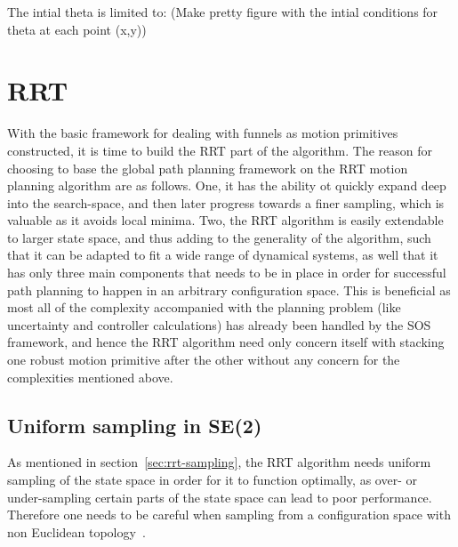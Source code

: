 The intial theta is limited to: (Make pretty figure with the intial conditions
for theta at each point (x,y))

\section{RRT}

With the basic framework for dealing with funnels as motion primitives
constructed, it is time to build the \ac{RRT} part of the \rrtfunnel{}
algorithm. The reason for choosing to base the global path planning framework on
the \ac{RRT} motion planning algorithm are as follows. One, it has the ability
ot quickly expand deep into the search-space, and then later progress towards a
finer sampling, which is valuable as it avoids local minima. Two, the \ac{RRT}
algorithm is easily extendable to larger state space, and thus adding to the
generality of the \rrtfunnel{} algorithm, such that it can be adapted to fit a
wide range of dynamical systems, as well that it has only three main components
that needs to be in place in order for successful path planning to happen in an
arbitrary configuration space. This is beneficial as most all of the complexity
accompanied with the planning problem (like uncertainty and controller
calculations) has already been handled by the \ac{SOS} framework, and hence the
\ac{RRT} algorithm need only concern itself with stacking one robust motion
primitive after the other without any concern for the complexities mentioned
above.

\subsection{Uniform sampling in SE(2)}

As mentioned in section~\ref{sec:rrt-sampling}, the \ac{RRT} algorithm needs
uniform sampling of the state space in order for it to function optimally, as
over- or under-sampling certain parts of the state space can lead to poor
performance. Therefore one needs to be careful when sampling from a
configuration space with non Euclidean
topology~\cite{kuffnerEffectiveSamplingDistance2004}.

